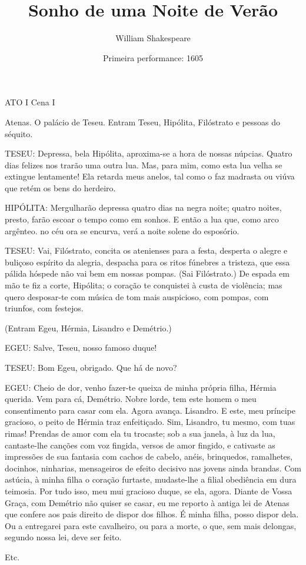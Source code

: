 \documentclass[a4paper,twoside]{book}
\title{Sonho de uma Noite de Verão}
\author{William Shakespeare}
\date{Primeira performance: 1605}
\begin{document}
\frenchspacing

\maketitle

ATO I
Cena I

Atenas. O palácio de Teseu. Entram Teseu, Hipólita, Filóstrato e pessoas do
séquito.

TESEU: Depressa, bela Hipólita, aproxima-se a hora de nossas núpcias. Quatro
dias felizes nos trarão uma outra lua. Mas, para mim, como esta lua velha se
extingue lentamente! Ela retarda meus anelos, tal como o faz madrasta ou viúva
que retém os bens do herdeiro.

HIPÓLITA: Mergulharão depressa quatro dias na negra noite; quatro noites,
presto, farão escoar o tempo como em sonhos. E então a lua que, como arco
argênteo. no céu ora se encurva, verá a noite solene do esposório.

TESEU: Vai, Filóstrato, concita os atenienses para a festa, desperta o alegre
e buliçoso espírito da alegria, despacha para os ritos fúnebres a tristeza, que
essa pálida hóspede não vai bem em nossas pompas. (Sai Filóstrato.) De espada
em mão te fiz a corte, Hipólita; o coração te conquistei à custa de violência;
mas quero desposar-te com música de tom mais auspicioso, com pompas, com
triunfos, com festejos.

(Entram Egeu, Hérmia, Lisandro e Demétrio.)

EGEU: Salve, Teseu, nosso famoso duque!

TESEU: Bom Egeu, obrigado. Que há de novo?

EGEU: Cheio de dor, venho fazer-te queixa de minha própria filha, Hérmia
querida. Vem para cá, Demétrio. Nobre lorde, tem este homem o meu consentimento
para casar com ela. Agora avança. Lisandro. E este, meu príncipe gracioso, o
peito de Hérmia traz enfeitiçado. Sim, Lisandro, tu mesmo, com tuas rimas!
Prendas de amor com ela tu trocaste; sob a sua janela, à luz da lua,
cantaste-lhe canções com voz fingida, versos de amor fingido, e cativaste as
impressões de sua fantasia com cachos de cabelo, anéis, brinquedos, ramalhetes,
docinhos, ninharias, mensageiros de efeito decisivo nas jovens ainda brandas.
Com astúcia, à minha filha o coração furtaste, mudaste-lhe a filial obediência
em dura teimosia. Por tudo isso, meu mui gracioso duque, se ela, agora. Diante
de Vossa Graça, com Demétrio não quiser se casar, eu me reporto à antiga lei de
Atenas que confere aos pais direito de dispor dos filhos. É minha filha, posso
dispor dela. Ou a entregarei para este cavalheiro, ou para a morte, o que, sem
mais delongas, segundo nossa lei, deve ser feito.

Etc.
\end{document}
